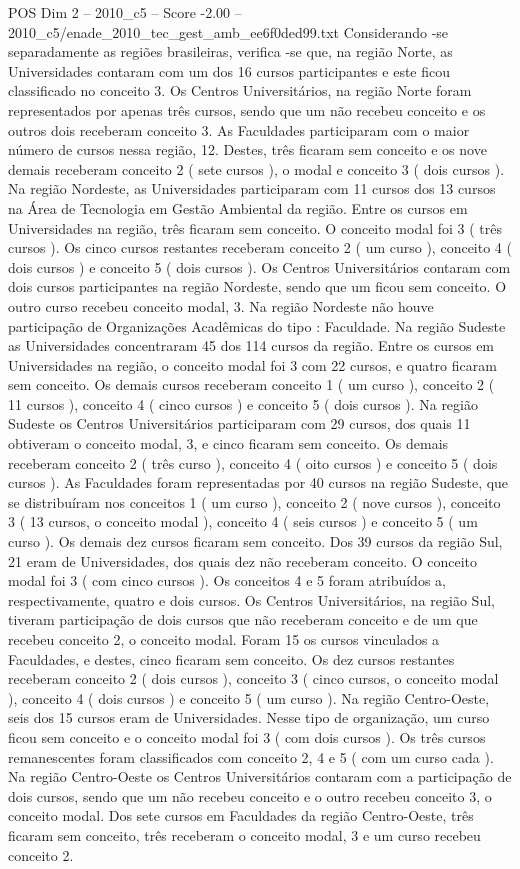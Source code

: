 \begin{textsample}{POS Dim 2 – 2010\_c5 – Score -2.00 – 2010\_c5/enade\_2010\_tec\_gest\_amb\_ee6f0ded99.txt}
Considerando -se separadamente as regiões brasileiras, verifica -se que, na região Norte, as Universidades contaram com um dos 16 cursos participantes e este ficou classificado no conceito 3.
Os Centros Universitários, na região Norte foram representados por apenas três cursos, sendo que um não recebeu conceito e os outros dois receberam conceito 3.
As Faculdades participaram com o maior número de cursos nessa região, 12.
Destes, três ficaram sem conceito e os nove demais receberam conceito 2 ( sete cursos ), o modal e conceito 3 ( dois cursos ).
Na região Nordeste, as Universidades participaram com 11 cursos dos 13 cursos na Área de Tecnologia em Gestão Ambiental da região.
Entre os cursos em Universidades na região, três ficaram sem conceito.
O conceito modal foi 3 ( três cursos ).
Os cinco cursos restantes receberam conceito 2 ( um curso ), conceito 4 ( dois cursos ) e conceito 5 ( dois cursos ).
Os Centros Universitários contaram com dois cursos participantes na região Nordeste, sendo que um ficou sem conceito.
O outro curso recebeu conceito modal, 3.
Na região Nordeste não houve participação de Organizações Acadêmicas do tipo : Faculdade.
Na região Sudeste as Universidades concentraram 45 dos 114 cursos da região.
Entre os cursos em Universidades na região, o conceito modal foi 3 com 22 cursos, e quatro ficaram sem conceito.
Os demais cursos receberam conceito 1 ( um curso ), conceito 2 ( 11 cursos ), conceito 4 ( cinco cursos ) e conceito 5 ( dois cursos ).
Na região Sudeste os Centros Universitários participaram com 29 cursos, dos quais 11 obtiveram o conceito modal, 3, e cinco ficaram sem conceito.
Os demais receberam conceito 2 ( três curso ), conceito 4 ( oito cursos ) e conceito 5 ( dois cursos ).
As Faculdades foram representadas por 40 cursos na região Sudeste, que se distribuíram nos conceitos 1 ( um curso ), conceito 2 ( nove cursos ), conceito 3 ( 13 cursos, o conceito modal ), conceito 4 ( seis cursos ) e conceito 5 ( um curso ).
Os demais dez cursos ficaram sem conceito.
Dos 39 cursos da região Sul, 21 eram de Universidades, dos quais dez não receberam conceito.
O conceito modal foi 3 ( com cinco cursos ).
Os conceitos 4 e 5 foram atribuídos a, respectivamente, quatro e dois cursos.
Os Centros Universitários, na região Sul, tiveram participação de dois cursos que não receberam conceito e de um que recebeu conceito 2, o conceito modal.
Foram 15 os cursos vinculados a Faculdades, e destes, cinco ficaram sem conceito.
Os dez cursos restantes receberam conceito 2 ( dois cursos ), conceito 3 ( cinco cursos, o conceito modal ), conceito 4 ( dois cursos ) e conceito 5 ( um curso ).
Na região Centro-Oeste, seis dos 15 cursos eram de Universidades.
Nesse tipo de organização, um curso ficou sem conceito e o conceito modal foi 3 ( com dois cursos ).
Os três cursos remanescentes foram classificados com conceito 2, 4 e 5 ( com um curso cada ).
Na região Centro-Oeste os Centros Universitários contaram com a participação de dois cursos, sendo que um não recebeu conceito e o outro recebeu conceito 3, o conceito modal.
Dos sete cursos em Faculdades da região Centro-Oeste, três ficaram sem conceito, três receberam o conceito modal, 3 e um curso recebeu conceito 2.

\end{textsample}
